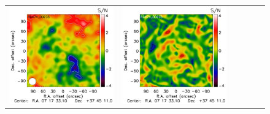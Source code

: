 \documentclass[twocolumn,traditabstract]{aa}
\begin{document}
\begin{figure}[h]
{\begin{tabular}{llllll}
\includegraphics[trim=2.3cm 2.2cm 0cm 0cm, clip=true, scale=1]{Figure/Map_RG474_00235_Ymap_zobs0p4_diff.pdf}  & 
\includegraphics[trim=2.3cm 2.2cm 0cm 0cm, clip=true, scale=1]{Figure/TFcheckGGM_RG474_00235_Ymap_zobs0p4_15_15_45.pdf}  & 

\end{tabular}}
\end{figure}
\end{document}
